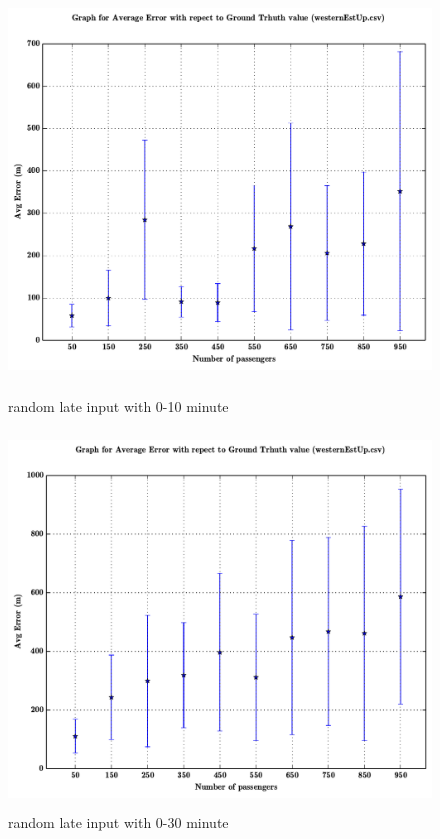 \documentclass[a4paper,12pt]{report}
\begin{document}
\begin{figure}[h!]

\centering
\includegraphics[height=10cm,width=17cm]{02_1prob-0-10minlate.pdf}
\caption{random late input with 0-10 minute}

\centering
\includegraphics[height=10cm,width=17cm]{03_1prob-30minlate.pdf}
\caption{random late input with 0-30 minute}
\end{figure}
\end{document}
